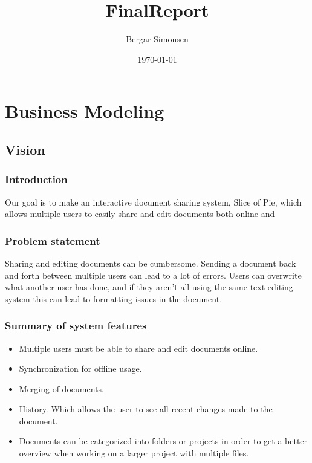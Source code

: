\documentclass[11pt]{article}
\title{FinalReport}
\author{Bergar Simonsen}
\date{\today}
\begin{document}
\maketitle

\setcounter{tocdepth}{3}
\tableofcontents
\vspace*{1cm}
\section{Business Modeling}
\label{sec-1}
\subsection{Vision}
\label{sec-1-1}
\subsubsection{Introduction}
\label{sec-1-1-1}

Our goal is to make an interactive document sharing system, Slice of Pie,  which allows multiple users to easily share and edit documents both online and 
\subsubsection{Problem statement}
\label{sec-1-1-2}

Sharing and editing documents can be cumbersome. 
Sending a document back and forth between multiple users can lead to a lot of errors. Users can overwrite what another user has done, and if they aren't all
using the same text editing system this can lead to formatting issues in the document.
\subsubsection{Summary of system features}
\label{sec-1-1-3}

\begin{itemize}
\item Multiple users must be able to share and edit documents online.
\item Synchronization for offline usage.
\item Merging of documents.
\item History. Which allows the user to see all recent changes made to the document.
\item Documents can be categorized into folders or projects in order to get a better overview when working on a larger project with multiple files.
\end{itemize}
\end{document}

